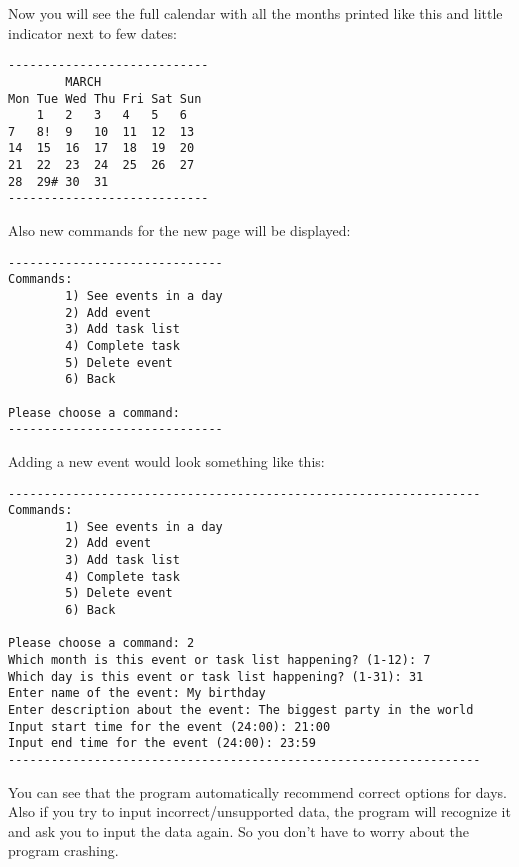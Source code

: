 \documentclass[a4paper, 12pt]{article}
\begin{document}
 Now you will see the full calendar with all the months printed like this and little indicator next to few dates:
 
  \begin{verbatim}
----------------------------
        MARCH   			 	
Mon Tue Wed Thu Fri Sat Sun	 	
    1   2   3   4   5   6	 	
7   8!  9   10  11  12  13	 	
14  15  16  17  18  19  20	 	
21  22  23  24  25  26  27	 	
28  29# 30  31	
----------------------------
     \end{verbatim}
     
Also new commands for the new page will be displayed:

  \begin{verbatim}
------------------------------
Commands:
        1) See events in a day
        2) Add event
        3) Add task list
        4) Complete task
        5) Delete event
        6) Back
                    
Please choose a command: 
------------------------------
     \end{verbatim}
     
Adding a new event would look something like this:

      \begin{verbatim}
------------------------------------------------------------------
Commands:
        1) See events in a day
        2) Add event
        3) Add task list
        4) Complete task
        5) Delete event
        6) Back
                    
Please choose a command: 2
Which month is this event or task list happening? (1-12): 7
Which day is this event or task list happening? (1-31): 31
Enter name of the event: My birthday
Enter description about the event: The biggest party in the world
Input start time for the event (24:00): 21:00
Input end time for the event (24:00): 23:59
------------------------------------------------------------------
     \end{verbatim}

You can see that the program automatically recommend correct options for days. Also if you try to input incorrect/unsupported data, the program will recognize it and ask you to input the data again. So you don't have to worry about the program crashing.
\end{document}
